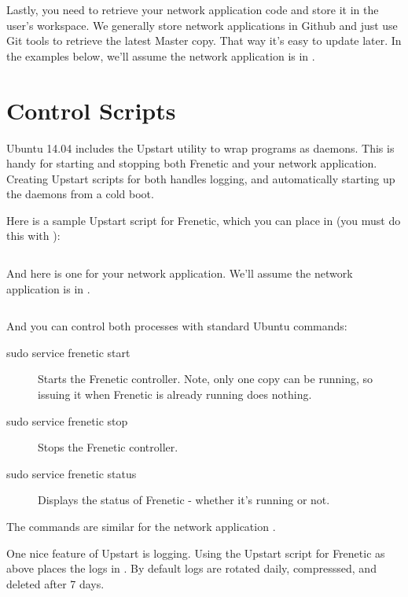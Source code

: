 Lastly, you need to retrieve your network application code and store it in the 
user's workspace.  We generally store network applications
in Github and just use Git tools to retrieve the latest Master copy.  That way it's easy to 
update later.  In the examples below, we'll assume the network application is in 
.  

\section{Control Scripts}

Ubuntu 14.04 includes the Upstart utility to wrap programs as daemons.  This is handy for 
starting and stopping both Frenetic and your network application.  Creating Upstart scripts
for both handles logging, and automatically starting up the daemons from a cold boot.

Here is a sample Upstart script for Frenetic, which you can place in 
 (you must do this with ):

\inputminted{bash}{code/productionalizing/frenetic.conf} 

And here is one for your network application.  We'll assume the network application is in 
.  

\inputminted{bash}{code/productionalizing/l2_learning_switch.conf} 

And you can control both processes with standard Ubuntu commands:

\begin{description}
\item[sudo service frenetic start] Starts the Frenetic controller.  Note, only one copy can be running, so
issuing it when Frenetic is already running does nothing.   
\item[sudo service frenetic stop] Stops the Frenetic controller.
\item[sudo service frenetic status] Displays the status of Frenetic - whether it's running or not.
\end{description}

The commands are similar for the network application .  

One nice feature of Upstart is logging.  Using the Upstart script for Frenetic as above places the logs 
in .  By default logs are rotated daily, compresssed, and 
deleted after 7 days.  

